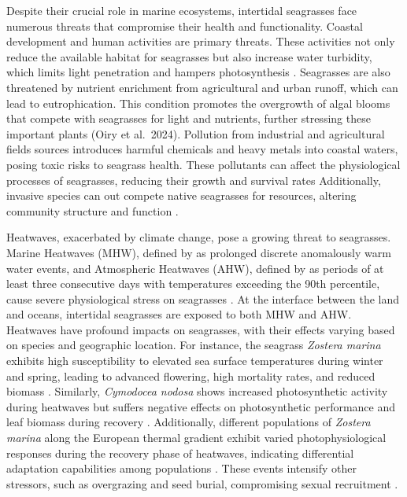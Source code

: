 \documentclass[
  number]{elsarticle}
\begin{document}
Despite their crucial role in marine ecosystems, intertidal seagrasses
face numerous threats that compromise their health and functionality.
Coastal development and human activities are primary threats. These
activities not only reduce the available habitat for seagrasses but also
increase water turbidity, which limits light penetration and hampers
photosynthesis \citep{waycott2009accelerating}. Seagrasses are also
threatened by nutrient enrichment from agricultural and urban runoff,
which can lead to eutrophication. This condition promotes the overgrowth
of algal blooms that compete with seagrasses for light and nutrients,
further stressing these important plants \citep{thomsen2023meadow} (Oiry
et al.~2024). Pollution from industrial and agricultural fields sources
introduces harmful chemicals and heavy metals into coastal waters,
posing toxic risks to seagrass health. These pollutants can affect the
physiological processes of seagrasses, reducing their growth and
survival rates \citep{sevgi2022bitkilerde} Additionally, invasive
species can out compete native seagrasses for resources, altering
community structure and function \citep{simpson2016distribution}.

Heatwaves, exacerbated by climate change, pose a growing threat to
seagrasses. Marine Heatwaves (MHW), defined by
\citep{hobday2016hierarchical} as prolonged discrete anomalously warm
water events, and Atmospheric Heatwaves (AHW), defined by
\citep{perkins2013measurement} as periods of at least three consecutive
days with temperatures exceeding the 90th percentile, cause severe
physiological stress on seagrasses
\citep{sawall2021chronically, deguette2022physiological}. At the
interface between the land and oceans, intertidal seagrasses are exposed
to both MHW and AHW. Heatwaves have profound impacts on seagrasses, with
their effects varying based on species and geographic location. For
instance, the seagrass \emph{Zostera marina} exhibits high
susceptibility to elevated sea surface temperatures during winter and
spring, leading to advanced flowering, high mortality rates, and reduced
biomass \citep{sawall2021chronically}. Similarly, \emph{Cymodocea
nodosa} shows increased photosynthetic activity during heatwaves but
suffers negative effects on photosynthetic performance and leaf biomass
during recovery \citep{deguette2022physiological}. Additionally,
different populations of \emph{Zostera marina} along the European
thermal gradient exhibit varied photophysiological responses during the
recovery phase of heatwaves, indicating differential adaptation
capabilities among populations \citep{winters2011effects}. These events
intensify other stressors, such as overgrazing and seed burial,
compromising sexual recruitment \citep{guerrero2020heat}.
\end{document}
